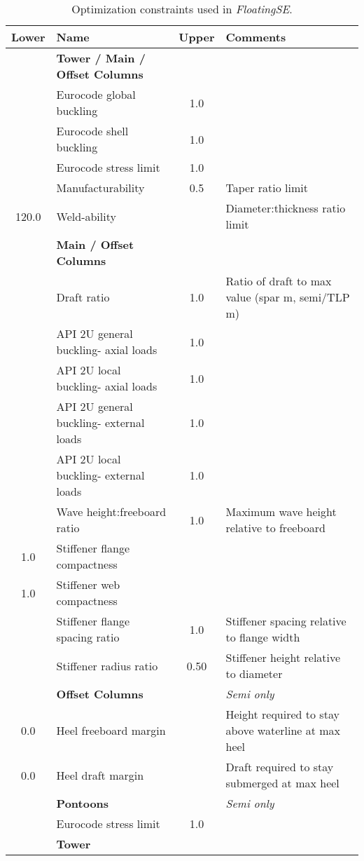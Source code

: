 \begin{table}[htbp] \begin{center}
    \caption{Optimization constraints used in \textit{FloatingSE}.}
    \label{tbl:constraints}
    {\footnotesize
  \begin{tabular}{ c l c l} \hline
    \textbf{Lower} & \textbf{Name} & \textbf{Upper} & \textbf{Comments}\\
\hline \hline
 & \textbf{Tower / Main / Offset Columns} &  & \\
 & Eurocode global buckling & 1.0 & \\
 & Eurocode shell buckling & 1.0 & \\
 & Eurocode stress limit & 1.0 & \\
  & Manufacturability & 0.5 & Taper ratio limit\\
  120.0 & Weld-ability &  & Diameter:thickness ratio limit\\
\hline & \textbf{Main / Offset Columns} &  & \\
 & Draft ratio & 1.0 & Ratio of draft to max value (spar \unit[200]{m}, semi/TLP \unit[30]{m})\\
 & API 2U general buckling- axial loads & 1.0 & \\
 & API 2U local buckling- axial loads & 1.0 & \\
 & API 2U general buckling- external loads & 1.0 & \\
 & API 2U local buckling- external loads & 1.0 & \\
 & Wave height:freeboard ratio & 1.0 & Maximum wave height relative to freeboard\\
  1.0 & Stiffener flange compactness &  & \\
  1.0 & Stiffener web compactness &  & \\
 & Stiffener flange spacing ratio & 1.0 & Stiffener spacing relative to flange width\\
 & Stiffener radius ratio & 0.50 & Stiffener height relative to diameter\\
\hline & \textbf{Offset Columns} &  & \textit{Semi only}\\
  0.0 & Heel freeboard margin &  & Height required to stay above waterline at max heel\\
  0.0 & Heel draft margin &  & Draft required to stay submerged at max heel\\
\hline & \textbf{Pontoons} &  & \textit{Semi only}\\
 & Eurocode stress limit & 1.0 &\\
\hline & \textbf{Tower} &  & \\

\end{tabular}}
\end{center}
\end{table}
